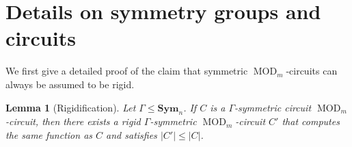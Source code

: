 \documentclass[11pt]{article}
\DeclareMathOperator{\MOD}{MOD}
\newcommand{\Sym}{\mathbf{Sym}}
\theoremstyle{definition}
\theoremstyle{plain}
\newtheorem{lemma}[definition]{Lemma}
\theoremstyle{remark}
\theoremstyle{remark}
\begin{document}
  










\newpage

\appendix 



\section{Details on symmetry groups and circuits}
\label{sec:appendixGroups}

We first give a detailed proof of the claim that symmetric $\MOD_m$-circuits can always be assumed to be rigid.

\begin{lemma}[Rigidification]
	\label{lem:rigidification}
	Let $\Gamma \leq \Sym_n$.
	If $C$ is a $\Gamma$-symmetric circuit $\MOD_m$-circuit, then there exists a rigid $\Gamma$-symmetric $\MOD_m$-circuit $C'$ that computes the same function as $C$ and satisfies $|C'| \leq |C|$.
\end{lemma}	
\end{document}
